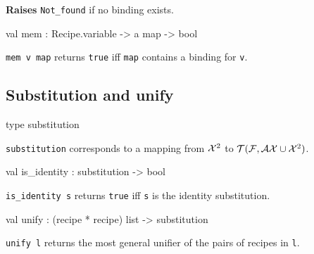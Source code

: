 \begin{ocamldocsigend}
\begin{ocamldocdescription}
{\bf Raises} {\tt{Not\_found}} if no binding exists.


\end{ocamldocdescription}


\label{val:Recipe.VariableMap.mem}\begin{ocamldoccode}
val mem : Recipe.variable -> {\textquotesingle}a map -> bool
\end{ocamldoccode}
\begin{ocamldocdescription}
{\tt{mem v map}} returns {\tt{true}} iff {\tt{map}} contains a binding for {\tt{v}}.


\end{ocamldocdescription}
\end{ocamldocsigend}






\subsection{Substitution and unify}




\label{type:Recipe.substitution}\begin{ocamldoccode}
type substitution 
\end{ocamldoccode}
\begin{ocamldocdescription}
{\tt{substitution}} corresponds to a mapping from $\mathcal{X}^2$ to $\mathcal{T}(\mathcal{F}, \mathcal{AX} \cup \mathcal{X}^2)$. 


\end{ocamldocdescription}




\label{val:Recipe.is-underscoreidentity}\begin{ocamldoccode}
val is_identity : substitution -> bool
\end{ocamldoccode}
\begin{ocamldocdescription}
{\tt{is\_identity s}} returns {\tt{true}} iff {\tt{s}} is the identity substitution.


\end{ocamldocdescription}




\label{val:Recipe.unify}\begin{ocamldoccode}
val unify : (recipe * recipe) list -> substitution
\end{ocamldoccode}
\begin{ocamldocdescription}
{\tt{unify l}} returns the most general unifier of the pairs of recipes in {\tt{l}}.


\end{ocamldocdescription}




